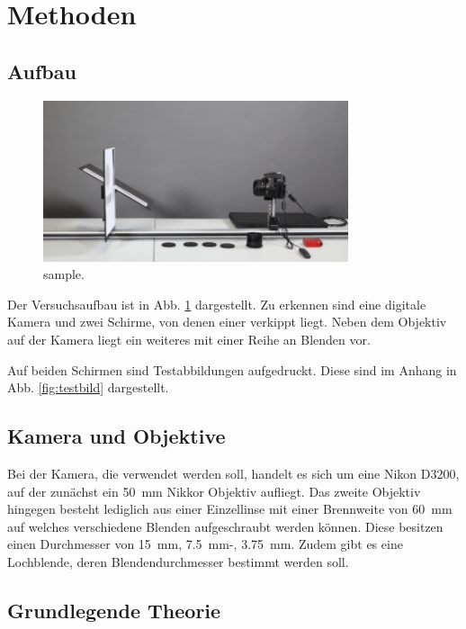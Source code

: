 \section{Methoden} \label{sec:Methoden}
	
	\subsection{Aufbau}	
		
		\begin{figure}[ht]
			\centering
			\includegraphics[width=0.8\textwidth]{bilder/aufbau.png}
			\caption{sample.\cite{WWU}}
			\label{fig:aufbau}	
		\end{figure}	
		Der Versuchsaufbau ist in Abb. \ref{fig:aufbau} dargestellt.
		Zu erkennen sind eine digitale Kamera und zwei Schirme, von denen einer verkippt liegt.
		Neben dem Objektiv auf der Kamera liegt ein weiteres mit einer Reihe an Blenden vor.
		
		Auf beiden Schirmen sind Testabbildungen aufgedruckt.
		Diese sind im Anhang in Abb. \ref{fig:testbild} dargestellt.
		
	\subsection{Kamera und Objektive}
	 
	 	Bei der Kamera, die verwendet werden soll, handelt es sich um eine Nikon D3200, auf der zunächst ein \SI{50}{\milli\meter} Nikkor Objektiv aufliegt.
		Das zweite Objektiv hingegen besteht lediglich aus einer Einzellinse mit einer Brennweite von \SI{60}{\milli\meter} auf welches verschiedene Blenden aufgeschraubt werden können.
		Diese besitzen einen Durchmesser von \SI{15}{\milli\meter}, \SI{7,5}{\milli\meter}-, \SI{3,75}{\milli\meter}.
		Zudem gibt es eine Lochblende, deren Blendendurchmesser bestimmt werden soll.
		
	\subsection{Grundlegende Theorie} \label{subsec:Theorie} %
		
